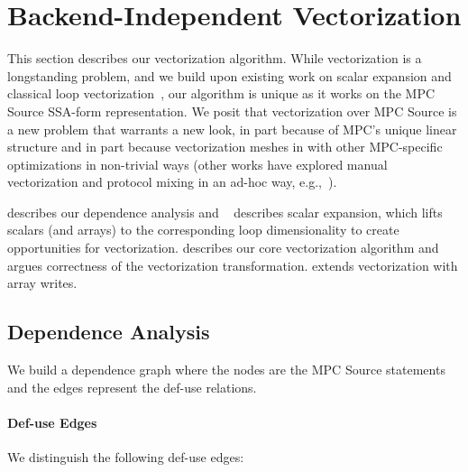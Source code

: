 
\section{Backend-Independent Vectorization}
\label{sec:vectorization}


This section describes our vectorization algorithm. While vectorization is a longstanding problem, 
and we build upon existing work on scalar expansion and classical loop vectorization~\cite{Allen:1987}, 
our algorithm is unique as it works on the MPC Source SSA-form representation. We posit that vectorization 
over MPC Source is a new problem that warrants a new look, in part because of MPC's unique linear 
structure and in part because vectorization meshes in with other MPC-specific optimizations in non-trivial ways
(other works have explored manual vectorization and protocol mixing in an ad-hoc way, e.g.,~\cite{NDSS:DemSchZoh15,CCS:BDKKS18,Ishaq:2019}).

 describes our dependence analysis and ~ describes scalar expansion,
which lifts scalars (and arrays) to the corresponding loop dimensionality to create opportunities for vectorization. 
 describes our core vectorization algorithm and~ argues correctness of the vectorization transformation.
 extends vectorization with array writes.   

\subsection{Dependence Analysis}
\label{sec:dependence}

We build a dependence graph where the nodes are the MPC Source statements and the edges represent the def-use relations.

\paragraph{Def-use Edges} We distinguish the following def-use edges:

